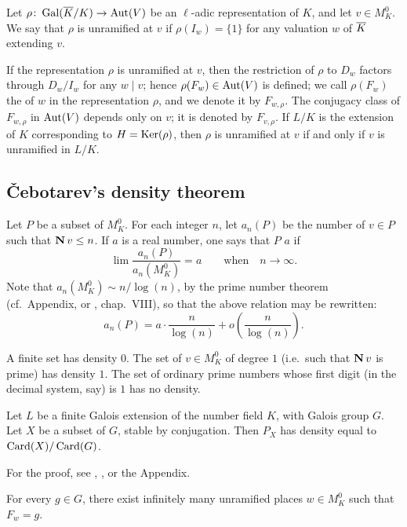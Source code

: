 \begin{mydef}
Let $\rho \colon \operatorname{Gal}(\overline{K}/K) \to \operatorname{Aut}(V)$ be an $\ell$-adic representation
of $K$, and let $v \in M_K^0$. We say that $\rho$ is unramified at $v$ if
$\rho(I_w) = \{ 1 \}$ for any valuation $w$ of $\overline{K}$ extending $v$.
\end{mydef}

If the representation $\rho$ is unramified at $v$, then the
\dpage
restriction of $\rho$ to $D_w$ factors through $D_w/I_w$ for any $w\mid v$;
hence $\rho(F_w) \in \operatorname{Aut}(V)$ is defined; we call $\rho(F_w)$ the
 of $w$ in the representation $\rho$, and we denote it by
$F_{w, \rho}$. The conjugacy class of $F_{w, \rho}$ in $\operatorname{Aut}(V)$ depends only
on $v$; it is denoted by $F_{v, \rho}$. If $L/K$ is the extension of $K$
corresponding to $H = \operatorname{Ker}(\rho)$, then $\rho$ is unramified at $v$ if and only
if $v$ is unramified in $L/K$.

\subsection{\v Cebotarev's density theorem}\label{sec:I_22}
Let $P$ be a subset of $M_K^0$. For each integer $n$, let $a_n(P)$
be the number of $v \in P$ such that $\operatorname{\mathbf{N}} v \le n$. If $a$ is a real number,
one says that $P$  $a$ if
\[
	\lim \frac{a_n(P)}{a_n(M_K^0)} = a \qquad \text{when}\quad n \to \infty.
\]
Note that $a_n(M_K^0) \sim n/\log(n)$, by the prime number theorem (cf.\
Appendix, or \cite{13}, chap.~VIII), so that the above relation may be
rewritten:
\[
	a_n(P) = a \cdot \frac{n}{\log(n)}
	+ o\mathopen{}\left( \frac{n}{\log(n)} \right)\mathclose{}.
\]
\begin{ex}
A finite set has density $0$. The set of $v \in M_K^0$ of degree $1$ (i.e.\ such
that $\operatorname{\mathbf{N}} v$ is prime) has density $1$. The set of ordinary prime numbers
whose first digit (in the decimal system, say) is $1$ has no density.
\end{ex}

\begin{thm}\label{thm-chebotarev}
Let $L$ be a finite Galois extension of the number field $K$, with Galois group
$G$. Let $X$ be a subset of $G$, stable by
\dpage
conjugation. Then $P_X$ has density equal to $\operatorname{Card}(X)/\operatorname{Card}(G)$. 
\end{thm}
For the proof, see \cite{7}, \cite{1}, or the Appendix.

\begin{cor}
For every $g \in G$, there exist infinitely many unramified places $w \in
M_K^0$ such that $F_w = g$.
\end{cor}

